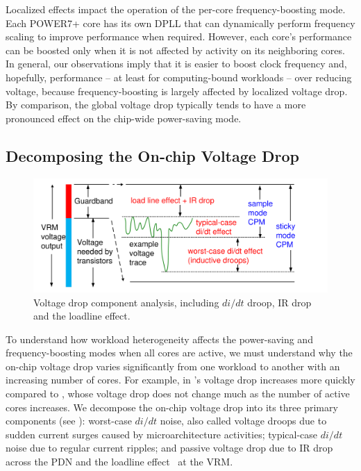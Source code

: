 Localized effects impact the operation of the per-core frequency-boosting mode. Each POWER7+ core has its own DPLL that can dynamically perform frequency scaling to improve performance when required. However, each core's performance can be boosted only when it is not affected by activity on its neighboring cores. In general, our observations imply that it is easier to boost clock frequency and, hopefully, performance -- at least for computing-bound workloads -- over reducing voltage, because frequency-boosting is largely affected by localized voltage drop. By comparison, the global voltage drop typically tends to have a more pronounced effect on the chip-wide power-saving mode. 

\subsection{Decomposing the On-chip Voltage Drop}
\label{sec:voltage:rootcause:vdrop-decompose}

\begin{figure}
  \centering
  \includegraphics[trim=0 0 0 0,clip,width=0.9\linewidth]{graphs/voltage/noise_components.pdf}
  \captionsetup{width=0.95\textwidth}
  \caption{Voltage drop component analysis, including $di/dt$ droop, IR drop and the loadline effect.}
  \label{fig:vnoise-component} 
\end{figure}

To understand how workload heterogeneity affects the power-saving and frequency-boosting modes when all cores are active, we must understand why the on-chip voltage drop varies significantly from one workload to another with an increasing number of cores. For example, in  's voltage drop increases more quickly compared to , whose voltage drop does not change much as the number of active cores increases.  We decompose the on-chip voltage drop into its three primary components (see ): worst-case $di/dt$ noise, also called voltage droops due to sudden current surges caused by microarchitecture activities; typical-case $di/dt$ noise due to regular current ripples; and passive voltage drop due to IR drop across the PDN and the loadline effect~\cite{lefurgy2011active} at the VRM.

